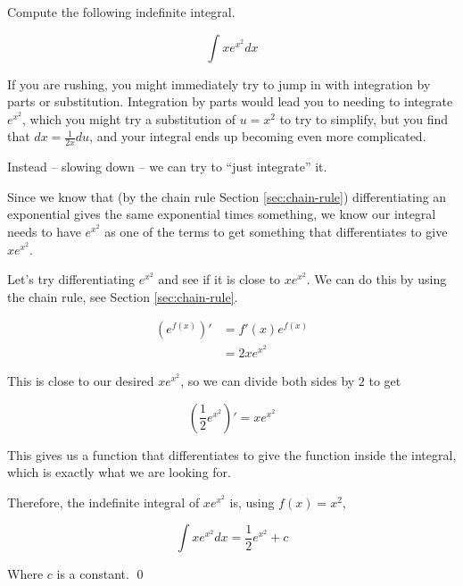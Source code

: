 \begin{example}
    Compute the following indefinite integral.

    \[ \int x e^{x^2} dx\]
\end{example}
\begin{solution}
    If you are rushing, you might immediately try to jump in with integration by parts or substitution.
    Integration by parts would lead you to needing to integrate $e^{x^2}$, which you might try a substitution of 
    $u = x^2$ to try to simplify, but you find that $dx = \frac{1}{2x}du$, and your integral ends up becoming even more complicated.

    Instead -- slowing down -- we can try to ``just integrate'' it.

    Since we know that (by the chain rule Section \ref{sec:chain-rule}) differentiating an exponential gives the same exponential times something, we know our integral needs to 
    have $e^{x^2}$ as one of the terms to get something that differentiates to give $x e^{x^2}$.

    Let's try differentiating $e^{x^2}$ and see if it is close to $x e^{x^2}$. We can do this by using the chain rule, see Section \ref{sec:chain-rule}.

    \begin{align*}
        (e^{f(x)})' &= f'(x)e^{f(x)} \tag{using the chain rule}\\
         &= 2x e^{x^2} \tag{using $f(x) = x^2$}
    \end{align*}

    This is close to our desired $x e^{x^2}$, so we can divide both sides by $2$ to get

    \[ (\frac{1}{2}e^{x^2})' = x e^{x^2}\]

    This gives us a function that differentiates to give the function inside the integral, which is exactly what we are looking for.

    Therefore, the indefinite integral of $x e^{x^2}$ is, using $f(x) = x^2$,

    \[ \int x e^{x^2}dx = \frac{1}{2}e^{x^2} + c\]

    Where $c$ is a constant.
    \qed
\end{solution}

